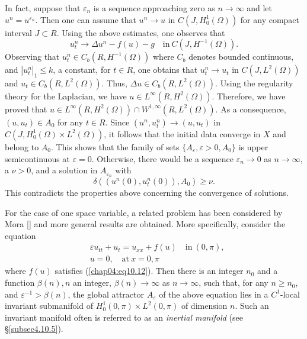 \documentclass{surv-l}
\theoremstyle{plain}
\theoremstyle{definition}
\numberwithin{equation}{section}
\numberwithin{figure}{chapter}
\begin{document}
In fact, suppose that $\varepsilon_{n}$ is a sequence approaching zero as $ n\rightarrow\infty$ and let $u^{n}=u^{\varepsilon_{n}}$. Then one can assume that $u^{n}\rightarrow u$ in $C(J, H_{0}^{1}(\Omega))$ for any compact interval $J\subset R$. Using the above estimates, one observes that
\begin{equation*}
u_{t}^{n}\rightarrow\Delta u^{n}-f(u)-g\quad \mathrm{in}\ C(J, H^{-1}(\Omega)).
\end{equation*}
Observing that $u_{t}^{n}\in C_{b}(R, H^{-1}(\Omega))$ where $C_{b}$ denotes bounded continuous, and $|u_{t}^{n}|_{1}\leq k$, a constant, for $t\in R$, one obtains that $u_{t}^{n}\rightarrow u_{t}$ in $C(J, L^{2}(\Omega))$ and $u_{t}\in C_{b}(R, L^{2}(\Omega))$. Thus, $\Delta u\in C_{b}(R, L^{2}(\Omega))$. Using the regularity theory for the Laplacian, we have $u\in L^{\infty}(R, H^{2}(\Omega))$. Therefore, we have proved that $u\in L^{\infty}(R, H^{2}(\Omega))\cap W^{1,\infty}(R, L^{2}(\Omega))$. As a consequence, $(u, u_{t})\in A_{0}$ for any $t\in R$. Since $(u^{n}, u_{t}^{n})\rightarrow(u, u_{t})$ in $C(J, H_{0}^{1}(\Omega)\times L^{2}(\Omega))$, it follows that the initial data converge in $X$ and belong to $A_{0}$. This shows that the family of sets $\{A_{\varepsilon}, \varepsilon>0, A_{0}\}$ is upper semicontinuous at $\varepsilon=0$. Otherwise, there would be a sequence $\varepsilon_{n}\rightarrow 0$ as $ n\rightarrow\infty$, a $\nu>0$, and a solution in $A_{\varepsilon_{n}}$ with
\begin{equation*}
\delta((u^{n}(0), u_{t}^{n}(0)), A_{0})\geq\nu.
\end{equation*}
This contradicts the properties above concerning the convergence of solutions.

For the case of one space variable, a related problem has been considered by Mora [\citeyear{1987m}] and more general results are obtained. More specifically, consider the equation
\begin{align*}
&\varepsilon u_{tt}+u_{t}=u_{xx}+f(u)\quad \mathrm{in}\ (0, \pi),\\
&u=0,\quad \mathrm{at}\ x=0, \pi
\end{align*}
where $f(u)$ satisfies (\ref{chap04:eq10.12}). Then there is an integer $n_{0}$ and a function $\beta(n), n$ an integer, $\beta(n)\rightarrow\infty$ as $ n\rightarrow\infty$, such that, for any $n\geq n_{0}$, and $\varepsilon^{-1}>\beta(n)$, the global attractor $A_{\varepsilon}$ of the above equation lies in a $C^{1}$-local invariant submanifold of $H_{0}^{1}(0, \pi)\times L^{2}(0, \pi)$ of dimension $n$. Such an invariant manifold often is referred to as an \emph{inertial manifold} (see \S \ref{subsec4.10.5}).
\end{document}
